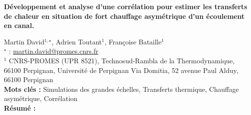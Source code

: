 


    \newpage


%
\begin{flushleft}
\addtocounter{section}{1}
{\Large \textbf{Développement et analyse d'une corrélation pour estimer les transferts de chaleur en situation de fort chauffage asymétrique d'un écoulement en canal.}}\label{ref:8}
\end{flushleft}
%
Martin David$^{1,\star}$, Adrien Toutant$^{1}$, Françoise Bataille$^{1}$\\[2mm]
$^{\star}$ \Letter : \url{martin.david@promes.cnrs.fr}\\[2mm]
{\footnotesize $^{1}$ CNRS-PROMES (UPR 8521), Technosud-Rambla de la Thermodynamique, 66100 Perpignan, Université de Perpignan Via Domitia, 52 avenue Paul Alduy, 66100 Perpignan}\\
[4mm]
%
\noindent \textbf{Mots clés : } Simulations des grandes échelles, Transferts thermique, Chauffage asymétrique, Corrélation\\[4mm]
%
\noindent \textbf{Résumé : } 

